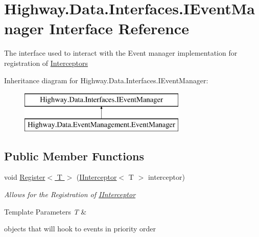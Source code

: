 \hypertarget{interface_highway_1_1_data_1_1_interfaces_1_1_i_event_manager}{\section{Highway.\-Data.\-Interfaces.\-I\-Event\-Manager Interface Reference}
\label{interface_highway_1_1_data_1_1_interfaces_1_1_i_event_manager}
}


The interface used to interact with the Event manager implementation for registration of \hyperlink{namespace_highway_1_1_data_1_1_interceptors}{Interceptors}  


Inheritance diagram for Highway.\-Data.\-Interfaces.\-I\-Event\-Manager\-:\begin{figure}[H]
\begin{center}
\leavevmode
\includegraphics[height=2.000000cm]{interface_highway_1_1_data_1_1_interfaces_1_1_i_event_manager}
\end{center}
\end{figure}
\subsection*{Public Member Functions}
\begin{DoxyCompactItemize}
\item 
void \hyperlink{interface_highway_1_1_data_1_1_interfaces_1_1_i_event_manager_a5573595e903c9d9831145aaca1b24fa7}{Register$<$ T $>$} (\hyperlink{interface_highway_1_1_data_1_1_interfaces_1_1_i_interceptor-g}{I\-Interceptor}$<$ T $>$ interceptor)
\begin{DoxyCompactList}\small\item\em Allows for the Registration of \hyperlink{interface_highway_1_1_data_1_1_interfaces_1_1_i_interceptor-g}{I\-Interceptor}
\begin{DoxyTemplParams}{Template Parameters}
{\em T} & \\
\hline
\end{DoxyTemplParams}
objects that will hook to events in priority order \end{DoxyCompactList}\end{DoxyCompactItemize}
